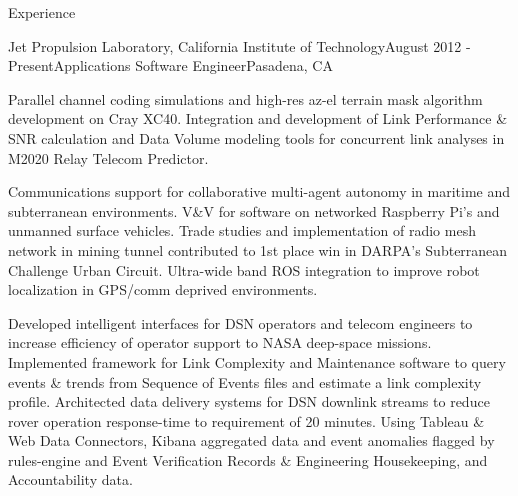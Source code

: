 \documentclass{resume} %
\begin{document}





\begin{rSection}{Experience}
\begin{rSubsection}{Jet Propulsion Laboratory, California Institute of Technology}{August 2012 - Present}{Applications Software Engineer}{Pasadena, CA}
\item  Parallel channel coding simulations and high-res az-el terrain mask algorithm development on Cray XC40. Integration and development of Link Performance \& SNR calculation and Data Volume modeling tools for concurrent link analyses in M2020 Relay Telecom Predictor.

\item Communications support for collaborative multi-agent autonomy in maritime and subterranean environments. V\&V for  software on networked Raspberry Pi's and unmanned surface vehicles.  Trade studies and implementation of radio mesh network in mining tunnel contributed to 1st place win in DARPA's Subterranean Challenge Urban Circuit. Ultra-wide band ROS integration to improve robot localization in GPS/comm deprived environments.

\item Developed intelligent interfaces for DSN operators and telecom engineers to increase efficiency of operator support to NASA deep-space missions. Implemented framework for Link Complexity and Maintenance software to query events \& trends from Sequence of Events files and estimate a link complexity profile. Architected data delivery systems for DSN downlink streams to reduce rover operation response-time to requirement of 20 minutes. Using Tableau \& Web Data Connectors, Kibana aggregated data and event anomalies flagged by rules-engine and Event Verification Records \& Engineering Housekeeping, and Accountability data. 


\end{rSubsection}
\end{rSection}
\end{document}
